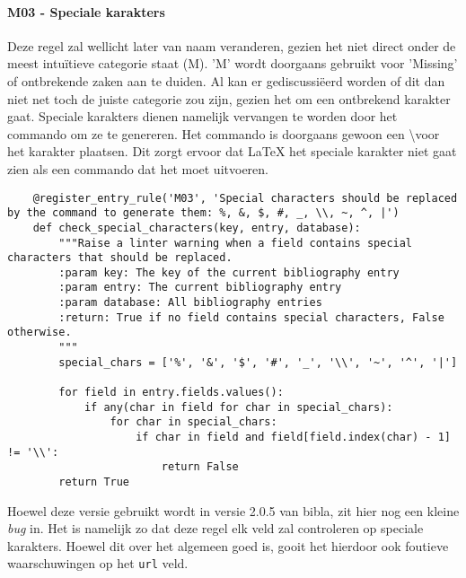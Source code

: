\paragraph{M03 - Speciale karakters}

Deze regel zal wellicht later van naam veranderen, gezien het niet direct onder de meest intuïtieve categorie staat (M). 'M' wordt doorgaans gebruikt voor 'Missing' of ontbrekende zaken aan te duiden. Al kan er gediscussiëerd worden of dit dan niet net toch de juiste categorie zou zijn, gezien het om een ontbrekend karakter gaat. Speciale karakters dienen namelijk vervangen te worden door het commando om ze te genereren. Het commando is doorgaans gewoon een \backslash voor het karakter plaatsen. Dit zorgt ervoor dat LaTeX het speciale karakter niet gaat zien als een commando dat het moet uitvoeren. 

\begin{verbatim}
    @register_entry_rule('M03', 'Special characters should be replaced by the command to generate them: %, &, $, #, _, \\, ~, ^, |')
    def check_special_characters(key, entry, database):
        """Raise a linter warning when a field contains special characters that should be replaced.
        :param key: The key of the current bibliography entry
        :param entry: The current bibliography entry
        :param database: All bibliography entries
        :return: True if no field contains special characters, False otherwise.
        """
        special_chars = ['%', '&', '$', '#', '_', '\\', '~', '^', '|']
    
        for field in entry.fields.values():
            if any(char in field for char in special_chars):
                for char in special_chars:
                    if char in field and field[field.index(char) - 1] != '\\':
                        return False
        return True
\end{verbatim}

Hoewel deze versie gebruikt wordt in versie 2.0.5 van bibla, zit hier nog een kleine \emph{bug} in. Het is namelijk zo dat deze regel elk veld zal controleren op speciale karakters. Hoewel dit over het algemeen goed is, gooit het hierdoor ook foutieve waarschuwingen op het \texttt{url} veld.



